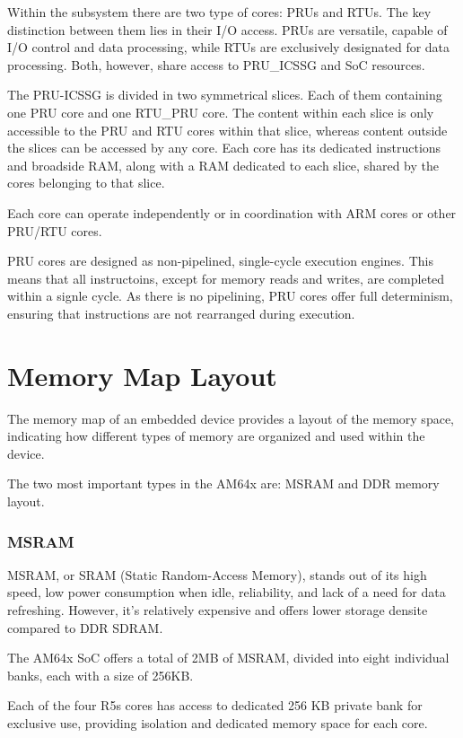 Within the subsystem there are two type of cores: PRUs and RTUs. The key
distinction between them lies in their I/O access. PRUs are versatile,
capable of I/O control and data processing, while RTUs are exclusively
designated for data processing. Both, however, share access to PRU\_ICSSG and
SoC resources.

The PRU-ICSSG is divided in two symmetrical slices. Each of them containing
one PRU core and one RTU\_PRU core.
The content within each slice is only accessible to the PRU and RTU cores
within that slice, whereas content outside the slices can be accessed by any
core.
Each core has its dedicated instructions and broadside RAM, along with a RAM
dedicated to each slice, shared by the cores belonging to that slice.

Each core can operate independently or in coordination with ARM cores or other
PRU/RTU cores.

PRU cores are designed as non-pipelined, single-cycle execution engines. This
means that all instructoins, except for memory reads and writes, are completed
within a signle cycle. As there is no pipelining, PRU cores offer full
determinism, ensuring that instructions are not rearranged during execution.

\section{Memory Map Layout}

The memory map of an embedded device provides a layout of the memory space,
indicating how different types of memory are organized and used within the
device.

The two most important types in the AM64x are: MSRAM and DDR memory layout.

\subsubsection{MSRAM}

MSRAM, or SRAM (Static Random-Access Memory), stands out of its high speed,
low power consumption when idle, reliability, and lack of a need for data
refreshing. However, it's relatively expensive and offers lower storage
densite compared to DDR SDRAM.

The AM64x SoC offers a total of 2MB of MSRAM, divided into eight individual
banks, each with a size of 256KB.

Each of the four R5s cores has access to dedicated 256 KB private bank for
exclusive use, providing isolation and dedicated memory space for each core.

